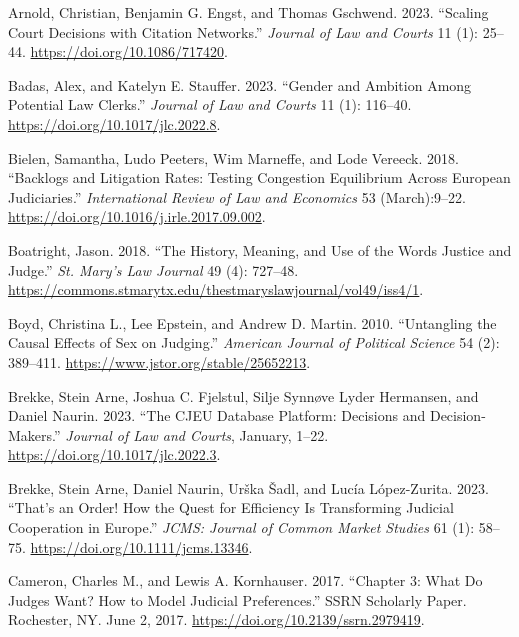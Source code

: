 \documentclass[
  11pt,
]{article}
\newlength{\cslhangindent}
\newenvironment{CSLReferences}[2] %
 {\begin{list}{}{%
  \setlength{\itemindent}{0pt}
  \setlength{\leftmargin}{0pt}
  \setlength{\parsep}{0pt}
  \ifodd #1
   \setlength{\leftmargin}{\cslhangindent}
   \setlength{\itemindent}{-1\cslhangindent}
  \fi
  \setlength{\itemsep}{#2\baselineskip}}}
 {\end{list}}
\begin{document}
\label{refs}
\begin{CSLReferences}{1}{0}
Arnold, Christian, Benjamin G. Engst, and Thomas Gschwend. 2023. {``Scaling {Court Decisions} with {Citation Networks}.''} \emph{Journal of Law and Courts} 11 (1): 25--44. \url{https://doi.org/10.1086/717420}.

Badas, Alex, and Katelyn E. Stauffer. 2023. {``Gender and {Ambition Among Potential Law Clerks}.''} \emph{Journal of Law and Courts} 11 (1): 116--40. \url{https://doi.org/10.1017/jlc.2022.8}.

Bielen, Samantha, Ludo Peeters, Wim Marneffe, and Lode Vereeck. 2018. {``Backlogs and Litigation Rates: {Testing} Congestion Equilibrium Across {European} Judiciaries.''} \emph{International Review of Law and Economics} 53 (March):9--22. \url{https://doi.org/10.1016/j.irle.2017.09.002}.

Boatright, Jason. 2018. {``The {History}, {Meaning}, and {Use} of the {Words Justice} and {Judge}.''} \emph{St. Mary's Law Journal} 49 (4): 727--48. \url{https://commons.stmarytx.edu/thestmaryslawjournal/vol49/iss4/1}.

Boyd, Christina L., Lee Epstein, and Andrew D. Martin. 2010. {``Untangling the {Causal Effects} of {Sex} on {Judging}.''} \emph{American Journal of Political Science} 54 (2): 389--411. \url{https://www.jstor.org/stable/25652213}.

Brekke, Stein Arne, Joshua C. Fjelstul, Silje Synnøve Lyder Hermansen, and Daniel Naurin. 2023. {``The {CJEU Database Platform}: {Decisions} and {Decision-Makers}.''} \emph{Journal of Law and Courts}, January, 1--22. \url{https://doi.org/10.1017/jlc.2022.3}.

Brekke, Stein Arne, Daniel Naurin, Urška Šadl, and Lucía López-Zurita. 2023. {``That's an {Order}! {How} the {Quest} for {Efficiency Is Transforming Judicial Cooperation} in {Europe}.''} \emph{JCMS: Journal of Common Market Studies} 61 (1): 58--75. \url{https://doi.org/10.1111/jcms.13346}.

Cameron, Charles M., and Lewis A. Kornhauser. 2017. {``Chapter 3: {What Do Judges Want}? {How} to {Model Judicial Preferences}.''} SSRN Scholarly Paper. Rochester, NY. June 2, 2017. \url{https://doi.org/10.2139/ssrn.2979419}.


\end{CSLReferences}
\end{document}
